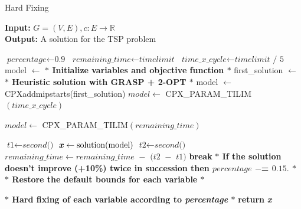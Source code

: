 \begin{algorithm}
    \caption{Hard Fixing}\label{Hard Fixing}
    
    \hspace*{\algorithmicindent} \textbf{Input:} $G = (V,E) , c : E \rightarrow \mathbb{R}$\\
    \hspace*{\algorithmicindent} \textbf{Output:} A solution for the TSP problem
    \begin{algorithmic}[1]
    \State $\textit{percentage} \gets \textit{0.9}$
    \State $\textit{remaining\_time} \gets \textit{timelimit}$
    \State $\textit{time\_x\_cycle} \gets \textit{timelimit / 5}$
    \State model $ \leftarrow $ \textbf{$\ast$ Initialize variables and objective function $\ast$ }
    \State first\_solution $ \leftarrow $ \textbf{$\ast$ Heuristic solution with GRASP + 2-OPT $\ast$ }
    \State model $ \leftarrow $  CPXaddmipstarts(first\_solution)
	\State $ model \gets $ CPX\_PARAM\_TILIM$(\textit{time\_x\_cycle}) $
	
	\Else \State $ model \gets $ CPX\_PARAM\_TILIM$(\textit{remaining\_time}) $
	\EndIf
	
	\State $\textit{t1} \gets \textit{second()}$
    	\State $\textbf{\textit{x}} \gets \text{solution}(\text{model}) $\;
	\State $\textit{t2} \gets \textit{second()}$
	\State $\textit{remaining\_time} \gets \textit{remaining\_time $-$ (t2 $-$ t1)}$
	\State \textbf{break}
	\EndIf
	\State \textbf{$\ast$ If the solution doesn't improve (+10\%) twice in succession then $ percentage $ $ -$= $ 0.15. $ $\ast$}
	\State \textbf{$\ast$ Restore the default bounds for each variable $\ast$}
    	\end{algorithmic}
	\label{alg:hf}
   	\end{algorithm}
	
	\begin{algorithm}                     
   	 \begin{algorithmic} [1]              
	\State \textbf{$\ast$ Hard fixing of each variable according to \textit{percentage} $\ast$}
    \EndWhile
    \State \textbf{return} \textbf{\textit{x}} 
    \end{algorithmic}
    \end{algorithm}


